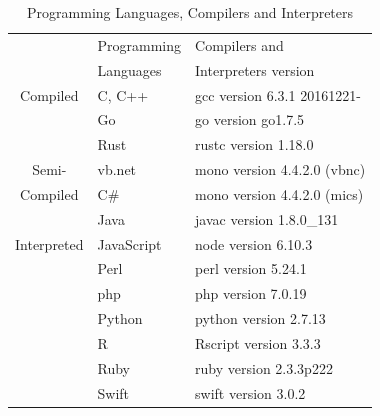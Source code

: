 \begin{table}
	\begin{threeparttable}
		\caption{Programming Languages, Compilers and Interpreters}
		\label{Languages_Compilers_and_Interpreters}
		\begin{tabular}{cll}
			\toprule
			& Programming  & Compilers and  \\
			& Languages  &  Interpreters version\\
			\midrule
			Compiled&C, C++	& gcc version 6.3.1 20161221- \\
			&Go		& go version go1.7.5  \\
			&Rust	& rustc version 1.18.0 \\
			\midrule
			Semi-&{\sc vb.net} & mono version 4.4.2.0 (vbnc)\\
			Compiled&C\#		& mono version 4.4.2.0 (mics)\\
			&Java	& javac version 1.8.0\_131 \\
			\midrule
			Interpreted&JavaScript & node version 6.10.3 \\
			&Perl	& perl version 5.24.1 \\
			&{\sc php}		& php version 7.0.19 \\
			&Python	& python version 2.7.13 \\
			&R		& Rscript version 3.3.3 \\
			&Ruby	& ruby version 2.3.3p222 \\
			
			&Swift 	& swift version 3.0.2 \\
			
			\bottomrule
		\end{tabular}
		
	\end{threeparttable}
\end{table}




